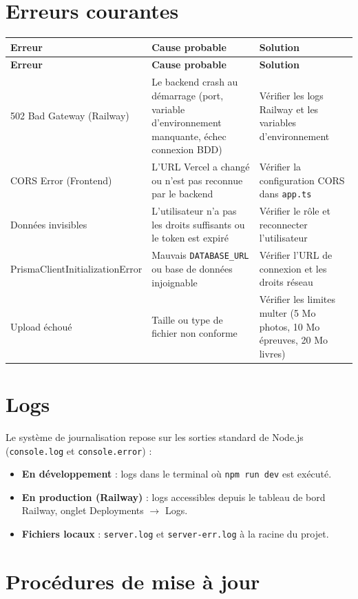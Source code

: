 \documentclass[12pt,a4paper]{report}
\begin{document}
\section{Erreurs courantes}
\begin{longtable}{|p{3.5cm}|p{5cm}|p{5.5cm}|}
\hline
\textbf{Erreur} & \textbf{Cause probable} & \textbf{Solution} \\
\hline
\endfirsthead
\hline
\textbf{Erreur} & \textbf{Cause probable} & \textbf{Solution} \\
\hline
\endhead
502 Bad Gateway (Railway) & Le backend crash au démarrage (port, variable d'environnement manquante, échec connexion BDD) & Vérifier les logs Railway et les variables d'environnement \\
\hline
CORS Error (Frontend) & L'URL Vercel a changé ou n'est pas reconnue par le backend & Vérifier la configuration CORS dans \texttt{app.ts} \\
\hline
Données invisibles & L'utilisateur n'a pas les droits suffisants ou le token est expiré & Vérifier le rôle et reconnecter l'utilisateur \\
\hline
PrismaClientInitializationError & Mauvais \texttt{DATABASE\_URL} ou base de données injoignable & Vérifier l'URL de connexion et les droits réseau \\
\hline
Upload échoué & Taille ou type de fichier non conforme & Vérifier les limites multer (5 Mo photos, 10 Mo épreuves, 20 Mo livres) \\
\hline
\end{longtable}
 
\section{Logs}
Le système de journalisation repose sur les sorties standard de Node.js (\texttt{console.log} et \texttt{console.error}) :
\begin{itemize}[leftmargin=*]
    \item \textbf{En développement} : logs dans le terminal où \texttt{npm run dev} est exécuté.
    \item \textbf{En production (Railway)} : logs accessibles depuis le tableau de bord Railway, onglet Deployments $\rightarrow$ Logs.
    \item \textbf{Fichiers locaux} : \texttt{server.log} et \texttt{server-err.log} à la racine du projet.
\end{itemize}
 
\section{Procédures de mise à jour}
 
\end{document}
